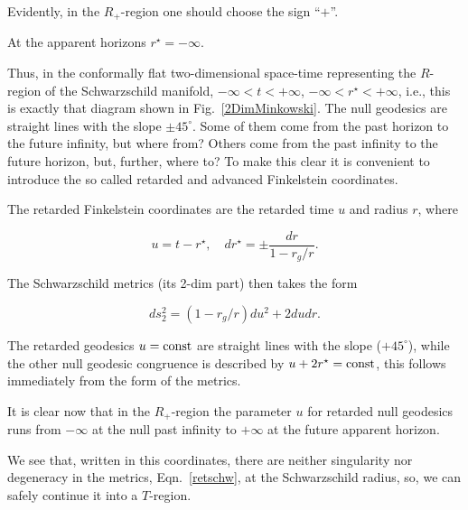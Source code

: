 Evidently, in the $R_+$-region one should choose the sign ``$+$''. 

At the apparent horizons $r^{\star} = - \infty$. 

Thus, in the conformally flat two-dimensional space-time representing the $R$-region of the Schwarzschild manifold, $-\infty < t < +\infty$, \linebreak ${-\infty < r^{\star} < +\infty}$, i.e., this is exactly that diagram shown in Fig.~\ref{2DimMinkowski}. The null geodesics are straight lines with the slope $\pm 45^{\circ}$. Some of them come from the past horizon to the future infinity, but where from? Others come from the past infinity to the future horizon, but, further, where to? To make this clear it is convenient to introduce the so called retarded and advanced Finkelstein coordinates.



The retarded Finkelstein coordinates are the retarded time $u$ and radius $r$, where

\begin{equation}

\label{finret}

u = t - r^{\star} ,\quad  dr^{\star} = \pm \frac{dr}{1 - {r_g}/{r}} .

\end{equation}

The Schwarzschild metrics (its 2-dim part) then takes the form

\begin{equation}

\label{retschw}

ds_2^2 = \left(1 - {r_g}/{r} \right) du^2 + 2 du dr .

\end{equation}

The retarded geodesics $u = \rm const$ are straight lines with the slope ($+ 45^{\circ}$), while the other null geodesic congruence is described by $u + 2 r^{\star} = \rm const$, this follows immediately from the form of the metrics. 

It is clear now that in the $R_+$-region the parameter $u$  for retarded null geodesics runs from ${-\infty}$ at the null past infinity to ${+\infty}$ at the future apparent horizon. 

We see that, written in this coordinates, there are neither singularity nor degeneracy in the metrics, Eqn.~\eqref{retschw}, at the Schwarzschild radius, so, we can safely continue it into a $T$-region. 

